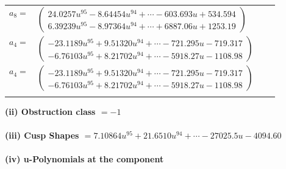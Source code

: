 \documentclass[1p]{elsarticle_modified}
\theoremstyle{definition}
\begin{document}
\begin{tabular}{m{7pt} m{180pt} m{7pt} m{180pt} }
\flushright $a_{8}=$&$\begin{pmatrix}24.0257 u^{95}-8.64454 u^{94}+\cdots-603.693 u+534.594\\6.39239 u^{95}-8.97364 u^{94}+\cdots+6887.06 u+1253.19\end{pmatrix}$ \\
\flushright $a_{4}=$&$\begin{pmatrix}-23.1189 u^{95}+9.51320 u^{94}+\cdots-721.295 u-719.317\\-6.76103 u^{95}+8.21702 u^{94}+\cdots-5918.27 u-1108.98\end{pmatrix}$\\ \flushright $a_{4}=$&$\begin{pmatrix}-23.1189 u^{95}+9.51320 u^{94}+\cdots-721.295 u-719.317\\-6.76103 u^{95}+8.21702 u^{94}+\cdots-5918.27 u-1108.98\end{pmatrix}$\\&\end{tabular}
\flushleft \textbf{(ii) Obstruction class $= -1$}\\~\\
\flushleft \textbf{(iii) Cusp Shapes $= 7.10864 u^{95}+21.6510 u^{94}+\cdots-27025.5 u-4094.60$}\\~\\
\newpage\renewcommand{\arraystretch}{1}
\flushleft \textbf{(iv) u-Polynomials at the component}\newline \\
\end{document}
